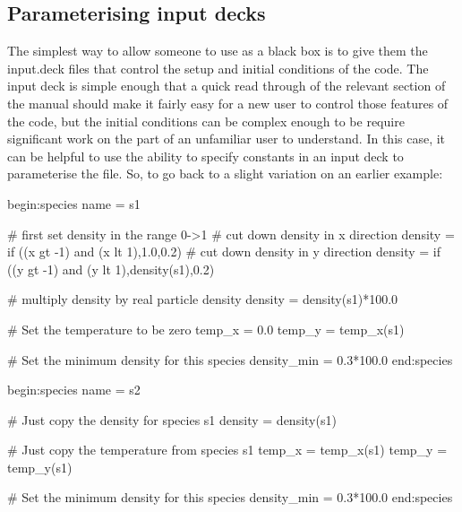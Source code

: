 \subsection{Parameterising input decks}
\label{sec:customising}
The simplest way to allow someone to use {\EPOCH} as a black box is to give them
the input.deck files that control the setup and initial conditions
of the code. The input deck is simple enough that a quick read through of the
relevant section of the manual should make it fairly easy for a new user to
control those features of the code, but the initial conditions can be complex
enough to be require significant work on the part of an unfamiliar user to
understand. In this case, it can be helpful to use the ability to specify
constants in an input deck to parameterise the file. So, to go back to a slight
variation on an earlier example:
\begin{boxverbatim}
begin:species
   name = s1

   # first set density in the range 0->1
   # cut down density in x direction
   density = if ((x gt -1) and (x lt 1),1.0,0.2)
   # cut down density in y direction
   density = if ((y gt -1) and (y lt 1),density(s1),0.2)

   # multiply density by real particle density
   density = density(s1)*100.0

   # Set the temperature to be zero
   temp_x = 0.0
   temp_y = temp_x(s1)

   # Set the minimum density for this species
   density_min = 0.3*100.0
end:species

begin:species
   name = s2

   # Just copy the density for species s1
   density = density(s1)

   # Just copy the temperature from species s1
   temp_x = temp_x(s1)
   temp_y = temp_y(s1)

   # Set the minimum density for this species
   density_min = 0.3*100.0
end:species
\end{boxverbatim}

